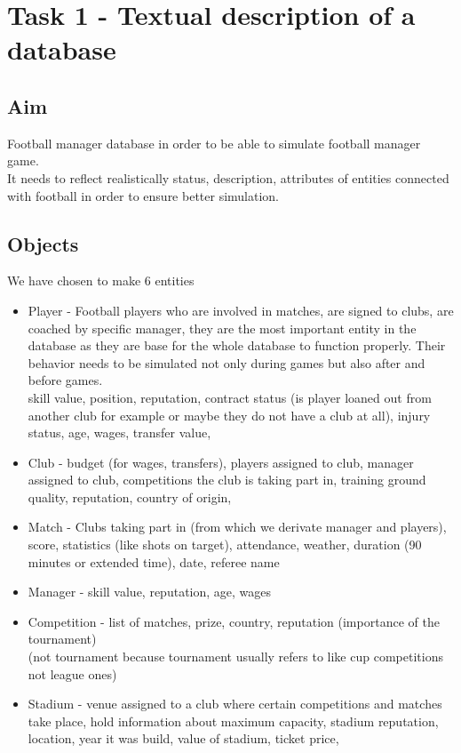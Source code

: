 \documentclass{report}
\begin{document}
\chapter{Task 1 - Textual description of a database}
\section{Aim}

Football manager database in order to be able to simulate football manager game. \\ 
It needs to reflect realistically status, description, attributes of entities connected with football in order to ensure better simulation. \\ 


\section{Objects}
We have chosen to make 6 entities \\ 
\begin{itemize}
    \item Player - Football players who are involved in matches, are signed to clubs, are coached by specific manager, they are the most important entity in the database as they are base for the whole database to function properly. Their behavior needs to be simulated not only during games but also after and before games.\\
    skill value, position, reputation, contract status (is player loaned out from another club for example or maybe they do not have a club at all), injury status, age, wages, transfer value, 
    \item Club - budget (for wages, transfers), players assigned to club, manager assigned to club, competitions the club is taking part in, training ground quality, reputation, country of origin,
    \item Match - Clubs taking part in (from which we derivate manager and players), score, statistics (like shots on target), attendance, weather, duration (90 minutes or extended time), date, referee name
    \item Manager - skill value, reputation, age, wages
    \item Competition - list of matches, prize, country, reputation (importance of the tournament)\\
    (not tournament because tournament usually refers to like cup competitions not league ones)
    \item Stadium - venue assigned to a club where certain competitions and matches take place, hold information about maximum capacity, stadium reputation, location, year it was build, value of stadium, ticket price, 
\end{itemize} 
\end{document}
